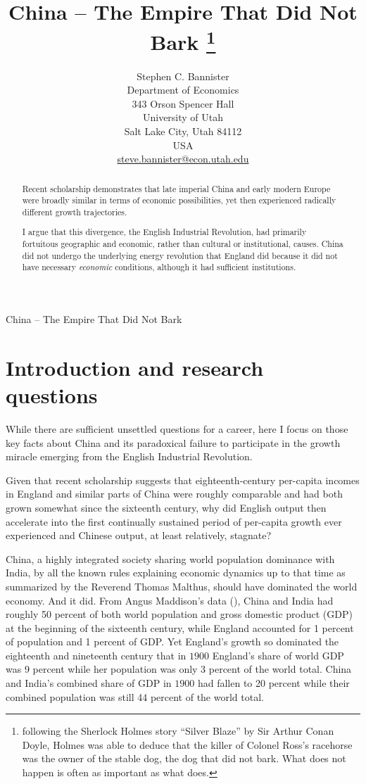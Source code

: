 \documentclass[12pt]{article}
\title{China -- The Empire That Did Not Bark \footnote{following the Sherlock Holmes story ``Silver Blaze'' by Sir Arthur Conan Doyle, Holmes was able to deduce that the killer of Colonel Ross's racehorse was the owner of the stable dog, the dog that did not bark. What does not happen is often as important as what does.}\\
}
\author{Stephen C. Bannister\\
	Department of Economics\\
	343 Orson Spencer Hall\\
	University of Utah\\
	Salt Lake City, Utah 84112\\
	USA\\
	\href{mailto:steve.bannister@econ.utah.edu}{steve.bannister@econ.utah.edu}\\
	}
\date{}
\numberwithin{equation}{section}
\begin{document}
\raggedright

\graphicspath{{../images/}}

%
	\maketitle

\newpage
	China -- The Empire That Did Not Bark\\
	\begin{abstract}
	Recent scholarship demonstrates that late imperial China and early modern Europe were broadly similar in terms of economic possibilities, yet then experienced radically different growth trajectories.
	
	I argue that this divergence, the English Industrial Revolution, had primarily fortuitous geographic and economic, rather than cultural or institutional, causes. China did not undergo the underlying energy revolution that England did because it did not have necessary \textit{economic} conditions, although it had sufficient institutions.
	\end{abstract}
	\section*{Introduction and research questions}
	While there are sufficient unsettled questions for a career, here I focus on those key facts about China and its paradoxical failure to participate in the growth miracle emerging from the English Industrial Revolution.
	
	Given that recent scholarship suggests that eighteenth-century per-capita incomes in England and similar parts of China were roughly comparable and had both grown somewhat since the sixteenth century, why did English output then accelerate into the first continually sustained period of per-capita growth ever experienced and Chinese output, at least relatively, stagnate? 
	
	China, a highly integrated society sharing world population dominance with India, by all the known rules explaining economic dynamics up to that time as summarized by the Reverend Thomas Malthus, should have dominated the world economy. And it did. From Angus Maddison's data (\citeyear{maddison_maddison_2010}), China and India had roughly 50 percent of both world population and gross domestic product (GDP) at the beginning of the sixteenth century, while England accounted for 1 percent of population and 1 percent of GDP. Yet England's growth so dominated the eighteenth and nineteenth century that in $1900$ England's share of world GDP was 9 percent while her population was only 3 percent of the world total. China and India's combined share of GDP in $1900$ had fallen to 20 percent while their combined population was still 44 percent of the world total. %
	
\end{document}
